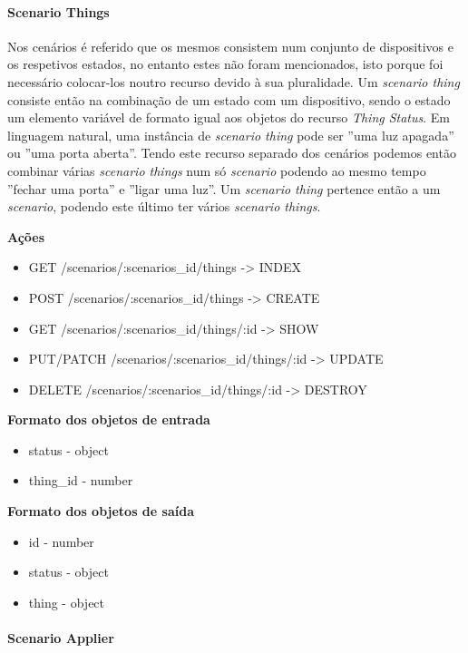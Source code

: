 \paragraph*{Scenario Things}

Nos cenários é referido que os mesmos consistem num conjunto de dispositivos e os respetivos estados, no entanto estes não foram mencionados, isto porque foi necessário colocar-los noutro recurso devido à sua pluralidade. Um \textit{scenario thing} consiste então na combinação de um estado com um dispositivo, sendo o estado um elemento variável de formato igual aos objetos do recurso \textit{Thing Status}. Em linguagem natural, uma instância de \textit{scenario thing} pode ser ''uma luz apagada'' ou ''uma porta aberta''. Tendo este recurso separado dos cenários podemos então combinar várias \textit{scenario things} num só \textit{scenario} podendo ao mesmo tempo ''fechar uma porta'' e ''ligar uma luz''. Um \textit{scenario thing} pertence então a um \textit{scenario}, podendo este último ter vários \textit{scenario things}.

\textbf{Ações}
\begin{itemize}
    \item GET /scenarios/:scenarios{\_}id/things -> INDEX
    \item POST /scenarios/:scenarios{\_}id/things -> CREATE
    \item GET /scenarios/:scenarios{\_}id/things/:id -> SHOW
    \item PUT/PATCH /scenarios/:scenarios{\_}id/things/:id -> UPDATE
    \item DELETE /scenarios/:scenarios{\_}id/things/:id -> DESTROY
\end{itemize}

\textbf{Formato dos objetos de entrada}
\begin{itemize}
    \item status - object
    \item thing{\_}id - number
\end{itemize}

\textbf{Formato dos objetos de saída}
\begin{itemize}
    \item id - number
    \item status - object
    \item thing - object
\end{itemize}

\paragraph*{Scenario Applier}


